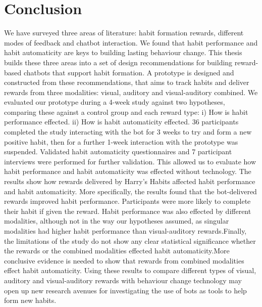 \section{Conclusion}
We have surveyed three areas of literature: habit formation rewards, different modes of feedback and chatbot interaction. We found that habit performance and habit automaticity are keys to building lasting behaviour change. This thesis builds these three areas into a set of design recommendations for building reward-based chatbots that support habit formation.
A prototype is designed and constructed from these recommendations, that aims to track habits and deliver rewards from three modalities: visual, auditory and visual-auditory combined.
We evaluated our prototype during a 4-week study against two hypotheses, comparing these against a control group and each reward type: i) How is habit performance effected. ii) How is habit automaticity effected. 36 participants completed the study interacting with the bot for 3 weeks to try and form a new positive habit, then for a further 1-week interaction with the prototype was suspended. Validated habit automaticity questionnaires and 7 participant interviews were performed for further validation. This allowed us to evaluate how habit performance and habit automaticity was effected without technology. The results show how rewards delivered by Harry's Habits affected habit performance and habit automaticity.
More specifically,
the results found that the bot-delivered rewards improved habit performance. Participants were more likely to complete their habit if given the reward. Habit performance was also effected by different modalities, although not in the way our hypotheses assumed, as singular modalities had higher habit performance than visual-auditory rewards.Finally, the limitations of the study do not show any clear statistical significance whether the rewards or the combined modalities effected habit automaticity.More conclusive evidence is needed to show that rewards from combined modalities effect habit automaticity. Using these results to compare different types of visual, auditory and visual-auditory rewards with behaviour change technology may open up new research avenues for investigating the use of bots as tools to help form new habits.

